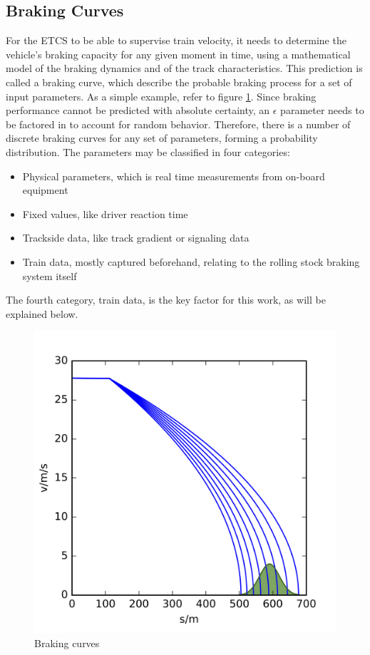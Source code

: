 \subsection{Braking Curves}
\label{sec:BrakingCurves}
\par\noindent
For the ETCS to be able to supervise train velocity, it needs to determine the vehicle's braking capacity for any given moment in time, using a mathematical model of the braking dynamics and of the track characteristics. This prediction is called a braking curve, which describe the probable braking process for a set of input parameters. As a simple example, refer to figure \ref{fig:brakingcurves}. Since braking performance cannot be predicted with absolute certainty, an $\epsilon$ parameter needs to be factored in to account for random behavior. Therefore, there is a number of discrete braking curves for any set of parameters, forming a probability distribution. The parameters may be classified in four categories:
\begin{itemize}
	\item Physical parameters, which is real time measurements from on-board equipment
	\item Fixed values, like driver reaction time
	\item Trackside data, like track gradient or signaling data
	\item Train data, mostly captured beforehand, relating to the rolling stock braking system itself
\end{itemize}
The fourth category, train data, is the key factor for this work, as will be explained below.

\begin{figure}[H]
	\centering
	\includegraphics[scale=0.2]{./pic/171026_Transrail_BrakingCurves-14}
	\caption{Braking curves}
	\label{fig:brakingcurves}
\end{figure}

